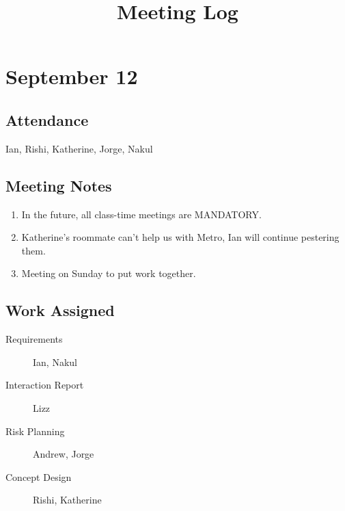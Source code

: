 \documentclass{article}
\title{Meeting Log}
\date{}
\begin{document}
\maketitle
\section{September 12}
	\subsection{Attendance}
		Ian, Rishi, Katherine, Jorge, Nakul
	\subsection{Meeting Notes}
	\begin{enumerate}
		\item In the future, all class-time meetings are MANDATORY.
		\item Katherine's roommate can't help us with Metro, Ian will continue pestering them.
		\item Meeting on Sunday to put work together.
	\end{enumerate}
	\subsection{Work Assigned}
	\begin{description}
		\item[Requirements] Ian, Nakul
		\item[Interaction Report] Lizz
		\item[Risk Planning] Andrew, Jorge
		\item[Concept Design] Rishi, Katherine
	\end{description}		
\end{document}
